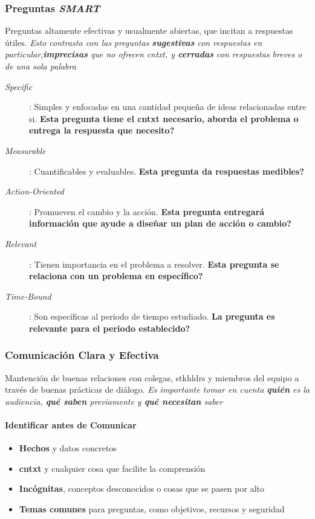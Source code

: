 \subsubsection{Preguntas \textit{SMART}}
Preguntas altamente efectivas y usualmente abiertas, que incitan a respuestas útiles. \textit{Esto contrasta con las preguntas \textbf{sugestivas} con respuestas en particular,\textbf{imprecisas} que no ofrecen \gls{cntxt}, y \textbf{cerradas} con respuestas breves o de una sola palabra}
\begin{description}
    \item [\textit{Specific}]{ : Simples y enfocadas en una cantidad pequeña de ideas relacionadas entre si. \textbf{Esta pregunta tiene el \gls{cntxt} necesario, aborda el problema o entrega la respuesta que necesito?}}
    \item [\textit{Measurable}]{ : Cuantificables y evaluables. \textbf{Esta pregunta da respuestas medibles?}}
    \item [\textit{Action-Oriented}]{ : Promueven el cambio y la acción. \textbf{Esta pregunta entregará información que ayude a diseñar un plan de acción o cambio?}}
    \item [\textit{Relevant}]{ : Tienen importancia en el problema a resolver. \textbf{Esta pregunta se relaciona con un problema en específico?}}
    \item [\textit{Time-Bound}]{ : Son específicas al periodo de tiempo estudiado. \textbf{La pregunta es relevante para el periodo establecido?}}
\end{description}

\subsubsection{Comunicación Clara y Efectiva}
Mantención de buenas relaciones con colegas, \gls{stkhldrs} y miembros del equipo a través de buenas prácticas de diálogo. \textit{Es importante tomar en cuenta \textbf{quién} es la audiencia, \textbf{qué saben} previamente y \textbf{qué necesitan} saber}

\paragraph{Identificar antes de Comunicar}
\begin{itemize}
    \item {\textbf{Hechos} y datos concretos}
    \item {\textbf{\gls{cntxt}} y cualquier cosa que facilite la comprensión}
    \item {\textbf{Incógnitas}, conceptos desconocidos o cosas que se pasen por alto}
    \item {\textbf{Temas comunes} para preguntas, como objetivos, recursos y seguridad}
\end{itemize}

